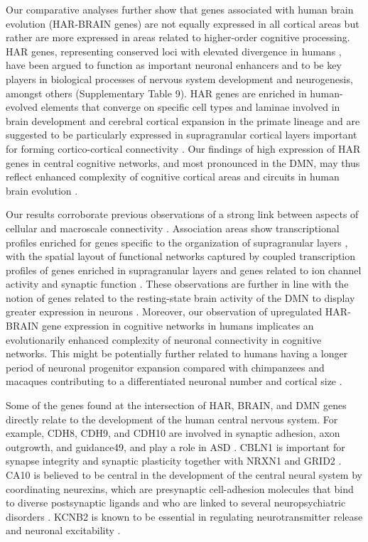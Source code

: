 \begin{refsection}
Our comparative analyses further show that genes associated with human brain evolution (HAR-BRAIN genes) are not equally expressed in all cortical areas but rather are more expressed in areas related to higher-order cognitive processing. HAR genes, representing conserved loci with elevated divergence in humans \citep{pollard2006rna,doan2016mutations}, have been argued to function as important neuronal enhancers \citep{Ryu256313} and to be key players in biological processes of nervous system development and neurogenesis, amongst others (Supplementary Table 9). HAR genes are enriched in human-evolved elements that converge on specific cell types and laminae involved in brain development and cerebral cortical expansion in the primate lineage \citep{won2019human} and are suggested to be particularly expressed in supragranular cortical layers important for forming cortico-cortical connectivity \citep{won2019human}. Our findings of high expression of HAR genes in central cognitive networks, and most pronounced in the DMN, may thus reflect enhanced complexity of cognitive cortical areas and circuits in human brain evolution \citep{elston2001pyramidal,jacobs2001regional}.

Our results corroborate previous observations of a strong link between aspects of cellular and macroscale connectivity \citep{vandenheuvel2019multi,scholtens2014linking}. Association areas show transcriptional profiles enriched for genes specific to the organization of supragranular layers \citep{vertes2016gene}, with the spatial layout of functional networks captured by coupled transcription profiles of genes enriched in supragranular layers \citep{krienen2016transcriptional} and genes related to ion channel activity and synaptic function \citep{richiardi2015correlated}. These observations are further in line with the notion of genes related to the resting-state brain activity of the DMN to display greater expression in neurons \citep{wang2015correspondence}. Moreover, our observation of upregulated HAR-BRAIN gene expression in cognitive networks in humans implicates an evolutionarily enhanced complexity of neuronal connectivity in cognitive networks. This might be potentially further related to humans having a longer period of neuronal progenitor expansion compared with chimpanzees and macaques contributing to a differentiated neuronal number and cortical size \citep{otani20162d}.

Some of the genes found at the intersection of HAR, BRAIN, and DMN genes directly relate to the development of the human central nervous system. For example, CDH8, CDH9, and CDH10 are involved in synaptic adhesion, axon outgrowth, and guidance49, and play a role in ASD \citep{redies2012cadherins}. CBLN1 is important for synapse integrity and synaptic plasticity together with NRXN1 and GRID2 \citep{hirai2005cbln1}. CA10 is believed to be central in the development of the central neural system by coordinating neurexins, which are presynaptic cell-adhesion molecules that bind to diverse postsynaptic ligands and who are linked to several neuropsychiatric disorders \citep{sterky2017carbonic}. KCNB2 is known to be essential in regulating neurotransmitter release and neuronal excitability \citep{coetzee1999molecular}.


\end{refsection}
